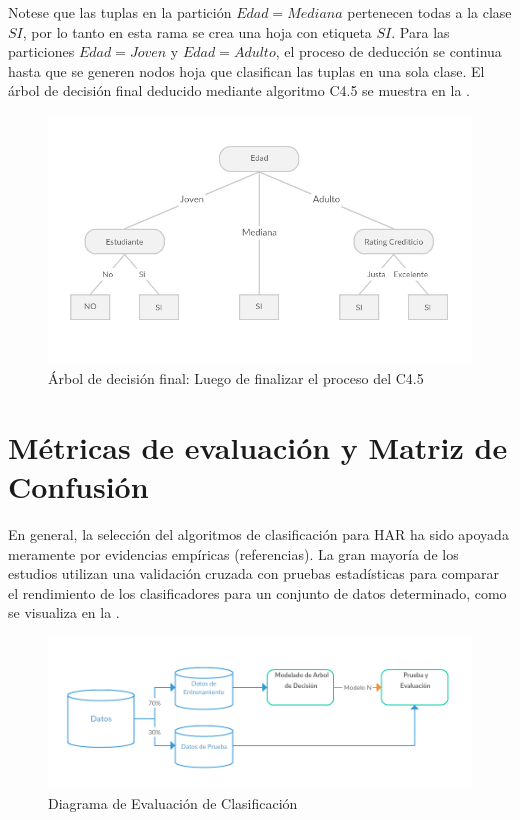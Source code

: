 Notese que las tuplas en la partición $Edad = Mediana$ pertenecen todas a la clase $SI$, por lo tanto en esta rama se crea una hoja con etiqueta $SI$. Para las particiones $Edad = Joven$ y $Edad = Adulto$, el proceso de deducción se continua hasta que se generen nodos hoja que clasifican las tuplas en una sola clase. El
 árbol de decisión final deducido mediante algoritmo C4.5 se muestra en la .
 
\begin{figure}[!tbph]
	\centering
	\includegraphics[width=0.7\linewidth]{capitulo-3/graphics/dtree_parti_final}
	\caption[Árbol de decisión Final]{Árbol de decisión final: Luego de finalizar el proceso del C4.5 }
	\label{fig:arbolFinal}
\end{figure}

\section{Métricas de evaluación y Matriz de Confusión}
En general, la selección del algoritmos de clasificación para HAR ha sido apoyada meramente por evidencias empíricas (referencias). La gran mayoría de los estudios utilizan una validación cruzada con pruebas estadísticas para comparar el rendimiento de los clasificadores para un conjunto de datos determinado, como se visualiza en la .

\begin{figure}[!tbph]
	\centering
	\includegraphics[width=0.7\linewidth]{capitulo-3/graphics/training-test}
	\caption[Diagrama de Evaluación de Clasificación]{Diagrama de Evaluación de Clasificación}
	\label{fig:evaluacion}
\end{figure}
	
